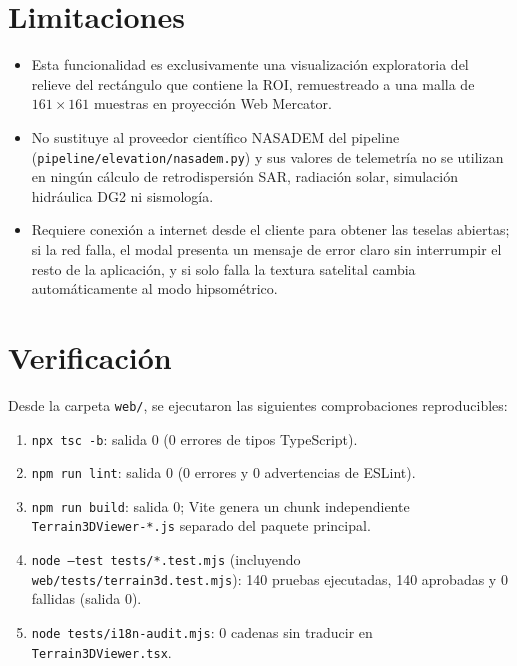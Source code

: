 \documentclass[11pt,a4paper]{article}
\begin{document}
\section{Limitaciones}
\begin{itemize}
  \item Esta funcionalidad es exclusivamente una visualizaci\'on exploratoria del relieve del rect\'angulo que contiene la ROI, remuestreado a una malla de $161 \times 161$ muestras en proyecci\'on Web Mercator.
  \item No sustituye al proveedor cient\'ifico NASADEM del pipeline (\texttt{pipeline/elevation/nasadem.py}) y sus valores de telemetr\'ia no se utilizan en ning\'un c\'alculo de retrodispersi\'on SAR, radiaci\'on solar, simulaci\'on hidr\'aulica DG2 ni sismolog\'ia.
  \item Requiere conexi\'on a internet desde el cliente para obtener las teselas abiertas; si la red falla, el modal presenta un mensaje de error claro sin interrumpir el resto de la aplicaci\'on, y si solo falla la textura satelital cambia autom\'aticamente al modo hipsom\'etrico.
\end{itemize}

\section{Verificaci\'on}
Desde la carpeta \texttt{web/}, se ejecutaron las siguientes comprobaciones reproducibles:
\begin{enumerate}
  \item \texttt{npx tsc -b}: salida 0 (0 errores de tipos TypeScript).
  \item \texttt{npm run lint}: salida 0 (0 errores y 0 advertencias de ESLint).
  \item \texttt{npm run build}: salida 0; Vite genera un chunk independiente \texttt{Terrain3DViewer-*.js} separado del paquete principal.
  \item \texttt{node --test tests/*.test.mjs} (incluyendo \texttt{web/tests/terrain3d.test.mjs}): 140 pruebas ejecutadas, 140 aprobadas y 0 fallidas (salida 0).
  \item \texttt{node tests/i18n-audit.mjs}: 0 cadenas sin traducir en \texttt{Terrain3DViewer.tsx}.
\end{enumerate}
\end{document}
